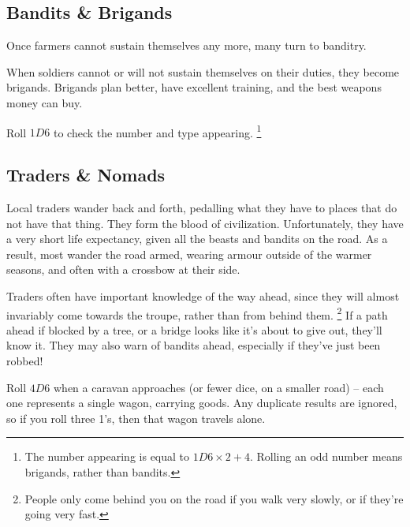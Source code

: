 \begin{multicols}{2}

\subsection{Bandits \& Brigands}

Once farmers cannot sustain themselves any more, many turn to banditry.

When soldiers cannot or will not sustain themselves on their duties, they become brigands.
Brigands plan better, have excellent training, and the best weapons money can buy.

Roll $1D6$ to check the number and type appearing.%
\footnote{The number appearing is equal to $1D6\times 2 + 4$.
Rolling an odd number means brigands, rather than bandits.}

\encBandits

\subsection{Traders \& Nomads}

Local traders wander back and forth, pedalling what they have to places that do not have that thing.
They form the blood of civilization.
Unfortunately, they have a very short life expectancy, given all the beasts and bandits on the road.
As a result, most wander the road armed, wearing armour outside of the warmer seasons, and often with a crossbow at their side.

Traders often have important knowledge of the way ahead, since they will almost invariably come towards the troupe, rather than from behind them.%
\footnote{People only come behind you on the road if you walk very slowly, or if they're going very fast.}
If a path ahead if blocked by a tree, or a bridge looks like it's about to give out, they'll know it.
They may also warn of bandits ahead, especially if they've just been robbed!

Roll $4D6$ when a caravan approaches (or fewer dice, on a smaller road) -- each one represents a single wagon, carrying goods.
Any duplicate results are ignored, so if you roll three 1's, then that wagon travels alone.

\encTraders

\end{multicols}

